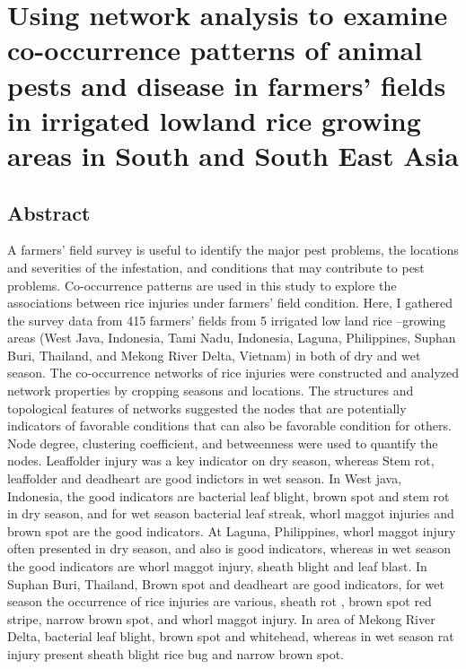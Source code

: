 \section{Using network analysis to examine co-occurrence patterns of animal pests and disease in farmers' fields in irrigated lowland rice growing areas in South and South East Asia}


\subsection{Abstract}
A farmers’ field survey is useful to identify the major pest problems, the locations and severities of the infestation, and conditions that may contribute to pest problems. Co-occurrence patterns are used in this study to explore the associations between rice injuries under farmers’ field condition. Here, I gathered the survey data from 415 farmers’ fields from 5 irrigated low land rice –growing areas (West Java, Indonesia, Tami Nadu, Indonesia, Laguna, Philippines, Suphan Buri, Thailand, and Mekong River Delta, Vietnam) in both of dry and wet season. The co-occurrence networks of rice injuries were constructed and analyzed network properties by cropping seasons and locations. The structures and topological features of networks suggested the nodes that are potentially indicators of favorable conditions that can also be favorable condition for others. Node degree, clustering coefficient, and betweenness were used to quantify the nodes. Leaffolder injury was a key indicator on dry season, whereas Stem rot, leaffolder and deadheart are good indictors in wet season. In West java, Indonesia, the good indicators are bacterial leaf blight, brown spot and stem rot in dry season, and for wet season bacterial leaf streak, whorl maggot injuries and brown spot are the good indicators. At Laguna, Philippines, whorl maggot injury often presented in dry season, and also is good indicators, whereas in wet season the good indicators are whorl maggot injury, sheath blight and leaf blast. In Suphan Buri, Thailand, Brown spot and deadheart are good indicators, for wet season the occurrence of rice injuries are various, sheath rot , brown spot red stripe, narrow brown spot, and whorl maggot injury. In area of Mekong River Delta, bacterial leaf blight, brown spot and whitehead, whereas in wet season rat injury present sheath blight rice bug and narrow brown spot.

